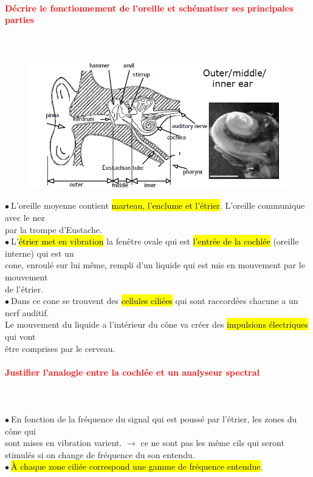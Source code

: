 \documentclass[letterpaper, 12pt]{article}
\newcommand{\alinea}{
\hspace*{0.3cm}}
\newcommand{\red}[1]{
	\textcolor{red}{#1}
}
\newcommand{\point}{$\bullet\ $}
\begin{document}
		\paragraph{\red{Décrire le fonctionnement de l'oreille et schématiser ses principales parties}}~\\
		\begin{figure}[H]
			\centering
			\includegraphics[scale=0.8]{Images/oreille}
		\end{figure}\noindent	
		\point L'oreille moyenne contient \hl{marteau, l'enclume et l'\'etrier}. L'oreille communique avec
			le nez \\\alinea par la trompe d'Eustache.\\
		\point L'\hl{\'etrier met en vibration} la fenêtre ovale qui est \hl{l'entr\'ee de la cochl\'ee} 
		(oreille interne)
		qui est un \\\alinea cone, enroulé sur lui même, rempli d'un liquide qui est mis en mouvement par le 
		mouvement \\\alinea  de l'étrier. \\
		\point Dans ce cone se trouvent des \hl{cellules cili\'ees} qui sont raccordées chacune
		a un nerf auditif. \\\alinea Le mouvement du liquide a l'intérieur du cône va créer des \hl{impulsions 
		\'electriques}
		qui vont \\\alinea être comprises par le cerveau.
		
		\paragraph{\red{Justifier l'analogie entre la cochlée et un analyseur spectral}}~\\~\\
			\point En fonction de la fr\'equence du signal qui est poussé par l'étrier, les zones
			du cône qui 
			\\\alinea sont mises en vibration varient. $\rightarrow$ ce ne sont pas les même cils qui seront 
			\\\alinea stimulés si on change de fréquence du son entendu.\\
			\point \hl{\`A chaque zone cili\'ee correspond une gamme de fr\'equence entendue}. 
			
\end{document}
